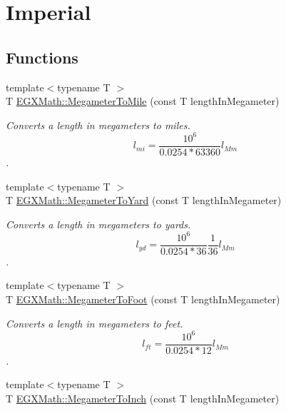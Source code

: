 \hypertarget{group___e_g_x_math-_conversions-_length_conversions-_megameter-_imperial}{}\section{Imperial}
\label{group___e_g_x_math-_conversions-_length_conversions-_megameter-_imperial}
\subsection*{Functions}
\begin{DoxyCompactItemize}
\item 
{\footnotesize template$<$typename T $>$ }\\T \mbox{\hyperlink{group___e_g_x_math-_conversions-_length_conversions-_megameter-_imperial_gaa20a079fd7502961010c93e0091ab17c}{E\+G\+X\+Math\+::\+Megameter\+To\+Mile}} (const T length\+In\+Megameter)
\begin{DoxyCompactList}\small\item\em Converts a length in megameters to miles. \[ l_{mi}=\frac{10^{6}}{0.0254 * 63360} l_{Mm} \]. \end{DoxyCompactList}\item 
{\footnotesize template$<$typename T $>$ }\\T \mbox{\hyperlink{group___e_g_x_math-_conversions-_length_conversions-_megameter-_imperial_gae8b77cb5d4f8cf566968e18dde870c74}{E\+G\+X\+Math\+::\+Megameter\+To\+Yard}} (const T length\+In\+Megameter)
\begin{DoxyCompactList}\small\item\em Converts a length in megameters to yards. \[ l_{yd}= \frac{10^{6}}{0.0254 * 36} \frac{1}{36} l_{Mm} \]. \end{DoxyCompactList}\item 
{\footnotesize template$<$typename T $>$ }\\T \mbox{\hyperlink{group___e_g_x_math-_conversions-_length_conversions-_megameter-_imperial_ga5586abd81d8635465b9be7f9be5fadc7}{E\+G\+X\+Math\+::\+Megameter\+To\+Foot}} (const T length\+In\+Megameter)
\begin{DoxyCompactList}\small\item\em Converts a length in megameters to feet. \[ l_{ft}= \frac{10^{6}}{0.0254 * 12} l_{Mm} \]. \end{DoxyCompactList}\item 
{\footnotesize template$<$typename T $>$ }\\T \mbox{\hyperlink{group___e_g_x_math-_conversions-_length_conversions-_megameter-_imperial_ga21eaef4c8ebcc2982ac3a212dc462a95}{E\+G\+X\+Math\+::\+Megameter\+To\+Inch}} (const T length\+In\+Megameter)

\end{DoxyCompactItemize}
